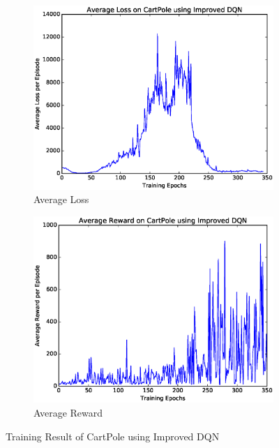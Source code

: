 \documentclass[a4paper,UTF8]{article}
\theoremstyle{definition}
\begin{document}
\begin{figure}[htbp]
	\centering
	\begin{subfigure}[t]{0.5\textwidth}
		\centering
		\includegraphics[scale=0.35]{figures/pole-idqn-loss}
		\caption{Average Loss}
	\end{subfigure}%
	\begin{subfigure}[t]{0.5\textwidth}
		\centering
		\includegraphics[scale=0.35]{figures/pole-idqn-reward}
		\caption{Average Reward}
	\end{subfigure}
	\caption{Training Result of CartPole using Improved DQN}\label{fig:pole-idqn}
\end{figure}
\end{document}

